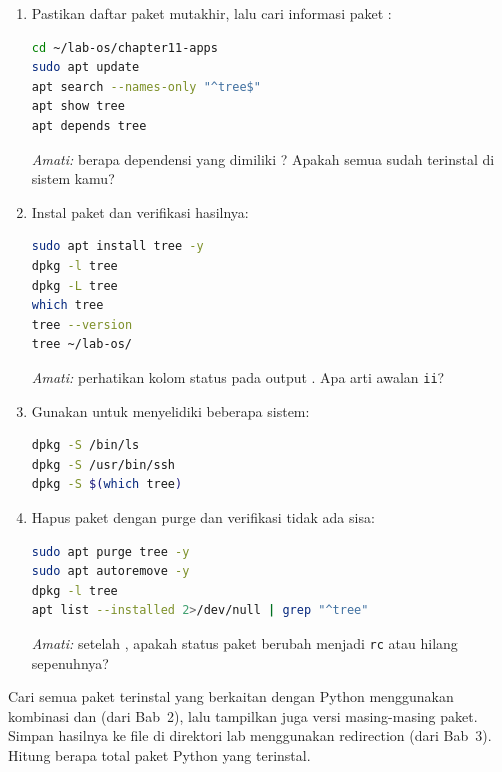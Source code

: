 \begin{enumerate}
    \item Pastikan daftar paket mutakhir, lalu cari informasi paket :
\begin{lstlisting}[language=bash, caption={Perbarui dan cari informasi paket}]
cd ~/lab-os/chapter11-apps
sudo apt update
apt search --names-only "^tree$"
apt show tree
apt depends tree
\end{lstlisting}
    \textit{Amati:} berapa dependensi yang dimiliki ? Apakah semua
    sudah terinstal di sistem kamu?

    \item Instal paket  dan verifikasi hasilnya:
\begin{lstlisting}[language=bash, caption={Instal dan verifikasi paket tree}]
sudo apt install tree -y
dpkg -l tree
dpkg -L tree
which tree
tree --version
tree ~/lab-os/
\end{lstlisting}
    \textit{Amati:} perhatikan kolom status pada output . Apa arti
    awalan \texttt{ii}?

    \item Gunakan  untuk menyelidiki beberapa  sistem:
\begin{lstlisting}[language=bash, caption={Mencari paket pemilik file}]
dpkg -S /bin/ls
dpkg -S /usr/bin/ssh
dpkg -S $(which tree)
\end{lstlisting}

    \item Hapus paket  dengan purge dan verifikasi tidak ada sisa:
\begin{lstlisting}[language=bash, caption={Hapus paket dan verifikasi sisa}]
sudo apt purge tree -y
sudo apt autoremove -y
dpkg -l tree
apt list --installed 2>/dev/null | grep "^tree"
\end{lstlisting}
    \textit{Amati:} setelah , apakah status paket berubah menjadi
    \texttt{rc} atau hilang sepenuhnya?
\end{enumerate}

\begin{challengebox}
Cari semua paket terinstal yang berkaitan dengan Python menggunakan kombinasi
 dan  (dari Bab~2), lalu tampilkan juga
versi masing-masing paket. Simpan hasilnya ke file 
di direktori lab menggunakan redirection (dari Bab~3). Hitung berapa total
paket Python yang terinstal.
\end{challengebox}

